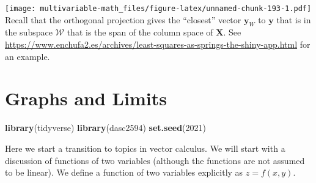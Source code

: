 \documentclass[
]{book}
\newenvironment{Shaded}{\begin{snugshade}}{\end{snugshade}}
\newcommand{\CommentTok}[1]{\textcolor[rgb]{0.56,0.35,0.01}{\textit{#1}}}
\newcommand{\DataTypeTok}[1]{\textcolor[rgb]{0.13,0.29,0.53}{#1}}
\newcommand{\DecValTok}[1]{\textcolor[rgb]{0.00,0.00,0.81}{#1}}
\newcommand{\KeywordTok}[1]{\textcolor[rgb]{0.13,0.29,0.53}{\textbf{#1}}}
\newcommand{\NormalTok}[1]{#1}
\newcommand{\OperatorTok}[1]{\textcolor[rgb]{0.81,0.36,0.00}{\textbf{#1}}}
\newcommand{\StringTok}[1]{\textcolor[rgb]{0.31,0.60,0.02}{#1}}
\theoremstyle{definition}
\theoremstyle{definition}
\theoremstyle{definition}
\theoremstyle{definition}
\theoremstyle{remark}
\begin{document}
\begin{Shaded}
\end{Shaded}

\texttt{[image: multivariable-math\_files/figure-latex/unnamed-chunk-193-1.pdf]}
Recall that the orthogonal projection gives the ``closest'' vector \(\mathbf{y}_W\) to \(\mathbf{y}\) that is in the subspace \(\mathcal{W}\) that is the span of the column space of \(\mathbf{X}\). See \url{https://www.enchufa2.es/archives/least-squares-as-springs-the-shiny-app.html} for an example.

\hypertarget{graphs-and-limits}{%
\chapter{Graphs and Limits}\label{graphs-and-limits}}

\begin{Shaded}
\begin{Highlighting}[]
\KeywordTok{library}\NormalTok{(tidyverse)}
\KeywordTok{library}\NormalTok{(dasc2594)}
\KeywordTok{set.seed}\NormalTok{(}\DecValTok{2021}\NormalTok{)}
\end{Highlighting}
\end{Shaded}

Here we start a transition to topics in vector calculus. We will start with a discussion of functions of two variables (although the functions are not assumed to be linear). We define a function of two variables explicitly as \(z = f(x, y)\).
\end{document}
